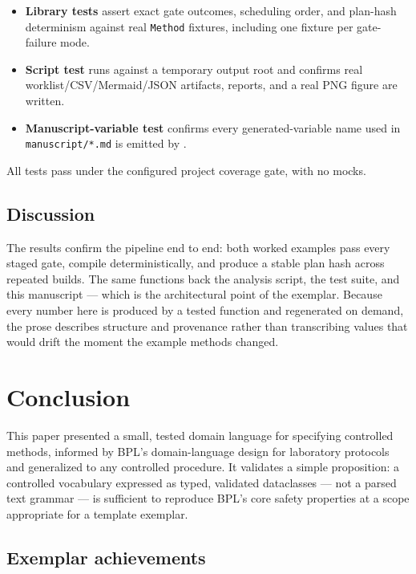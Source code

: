 \documentclass[
  english,
]{article}
\providecommand{\tightlist}{%
  \setlength{\itemsep}{0pt}\setlength{\parskip}{0pt}}
\begin{document}
\begin{itemize}
\tightlist
\item
  \textbf{Library tests} assert exact gate outcomes, scheduling order,
  and plan-hash determinism against real \texttt{Method} fixtures,
  including one fixture per gate-failure mode.
\item
  \textbf{Script test} runs  against a
  temporary output root and confirms real worklist/CSV/Mermaid/JSON
  artifacts, reports, and a real PNG figure are written.
\item
  \textbf{Manuscript-variable test} confirms every generated-variable
  name used in \texttt{manuscript/*.md} is emitted by
  .
\end{itemize}

All tests pass under the configured project coverage gate, with no
mocks.

\subsection{Discussion}\label{discussion}

The results confirm the pipeline end to end: both worked examples pass
every staged gate, compile deterministically, and produce a stable plan
hash across repeated builds. The same 
functions back the analysis script, the test suite, and this manuscript
--- which is the architectural point of the exemplar. Because every
number here is produced by a tested function and regenerated on demand,
the prose describes structure and provenance rather than transcribing
values that would drift the moment the example methods changed.

\newpage

\section{Conclusion}\label{sec:conclusion}

This paper presented a small, tested domain language for specifying
controlled methods, informed by BPL's \citep{bpl2026} domain-language
design for laboratory protocols and generalized to any controlled
procedure. It validates a simple proposition: a controlled vocabulary
expressed as typed, validated dataclasses --- not a parsed text grammar
--- is sufficient to reproduce BPL's core safety properties at a scope
appropriate for a template exemplar.

\subsection{Exemplar achievements}\label{exemplar-achievements}
\end{document}

